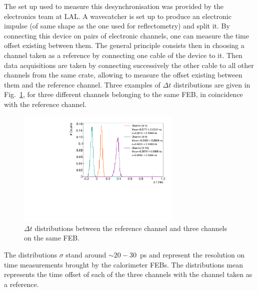 The set up used to measure this desynchronisation was provided by the electronics team at LAL.
A wavecatcher is set up to produce an electronic impulse (of same shape as the one used for reflectometry) and split it.
By connecting this device on pairs of electronic channels, one can measure the time offset existing between them.
The general principle consists then in choosing a channel taken as a reference by connecting one cable of the device to it.
Then data acquisitions are taken by connecting successively the other cable to all other channels from the same crate, allowing to measure the offset existing between them and the reference channel.
Three examples of $\Delta t$ distributions are given in Fig.~\ref{fig:FEB_offset}, for three different channels belonging to the same FEB, in coincidence with the reference channel.
\begin{figure}[h!]
  \centering
  \includegraphics[width=0.7\textwidth]{commissioning/fig_commissioning/time_offset.pdf}
  \caption{$\Delta t$ distributions between the reference channel and three channels on the same FEB.
    \label{fig:FEB_offset}}
\end{figure}
The distributions $\sigma$ stand around $\sim20-30$~ps and represent the resolution on time measurements brought by the calorimeter FEBs.
The distributions mean represents the time offset of each of the three channels with the channel taken as a reference.


